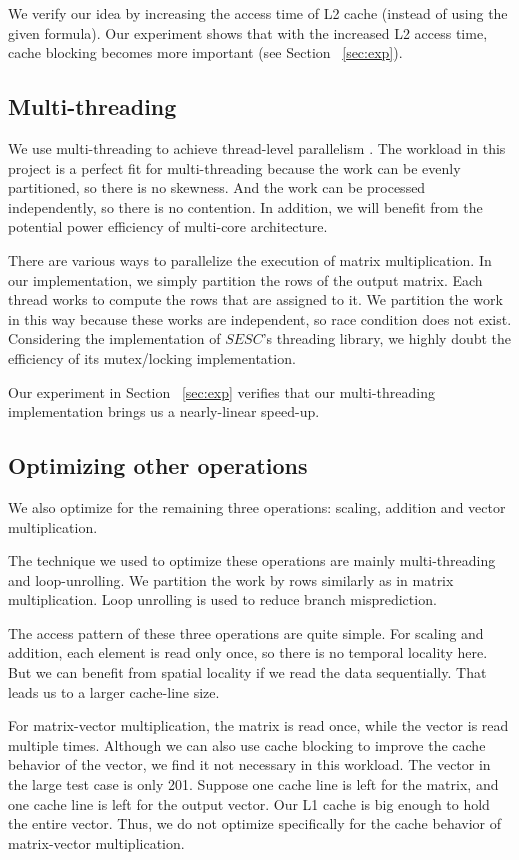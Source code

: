 \documentclass[twocolumn,letterpaper,10pt]{article}
\begin{document}
We verify our idea by increasing the access time of L2 cache (instead
of using the given formula). Our experiment shows that with the
increased L2 access time, cache blocking becomes more important (see
Section ~\ref{sec:exp}).

\subsection{Multi-threading}
We use multi-threading to achieve thread-level parallelism
. The workload in this project is a perfect fit for multi-threading because
the work can be evenly partitioned, so there is no skewness. And the
work can be processed independently, so there is no contention. In addition, we will benefit from the potential power efficiency of
multi-core architecture.

There are various ways to parallelize the execution of matrix
multiplication. In our implementation, we simply partition the rows of
the output matrix. Each thread works to compute the rows
that are assigned to it. We partition the work in this way because
these works are independent, so race condition does not
exist. Considering the implementation of $SESC$'s threading library, we
highly doubt the efficiency of its mutex/locking implementation.

Our experiment in Section ~\ref{sec:exp} verifies that our multi-threading implementation brings
us a nearly-linear speed-up.

\subsection{Optimizing other operations}
We also optimize for the remaining three operations: scaling, addition
and vector multiplication. 

The technique we used to optimize these operations are mainly
multi-threading and loop-unrolling. We partition the work by rows similarly as
in matrix multiplication. Loop unrolling is used to reduce branch misprediction.

The access pattern of these three operations are quite simple. For
scaling and addition, each element is read only once, so there is no
temporal locality here. But we can benefit from spatial locality if we
read the data sequentially. That leads us to a larger cache-line size.

For matrix-vector multiplication, the matrix is read once, while the
vector is read multiple times. Although we can also use cache blocking
to improve the cache behavior of the vector, we find it not necessary
in this workload. The vector in the large test case is only
201. Suppose one cache line is left for the matrix, and one cache line
is left for the output vector. Our L1 cache is big enough to hold the
entire vector. Thus, we do not optimize specifically for the cache
behavior of matrix-vector multiplication.
\end{document}
